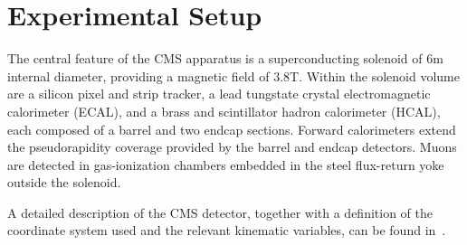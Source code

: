 
\chapter{Experimental Setup}

The central feature of the CMS apparatus is a superconducting solenoid of 6\unit{m} internal diameter, providing a magnetic field of 3.8\unit{T}. Within the solenoid volume are a silicon pixel and strip tracker, a lead tungstate crystal electromagnetic calorimeter (ECAL), and a brass and scintillator hadron calorimeter (HCAL), each composed of a barrel and two endcap sections. Forward calorimeters extend the pseudorapidity coverage provided by the barrel and endcap detectors. Muons are detected in gas-ionization chambers embedded in the steel flux-return yoke outside the solenoid. 

A detailed description of the CMS detector, together with a definition of the coordinate system used and the relevant kinematic variables, can be found in~\cite{Chatrchyan:2008zzk}.  


